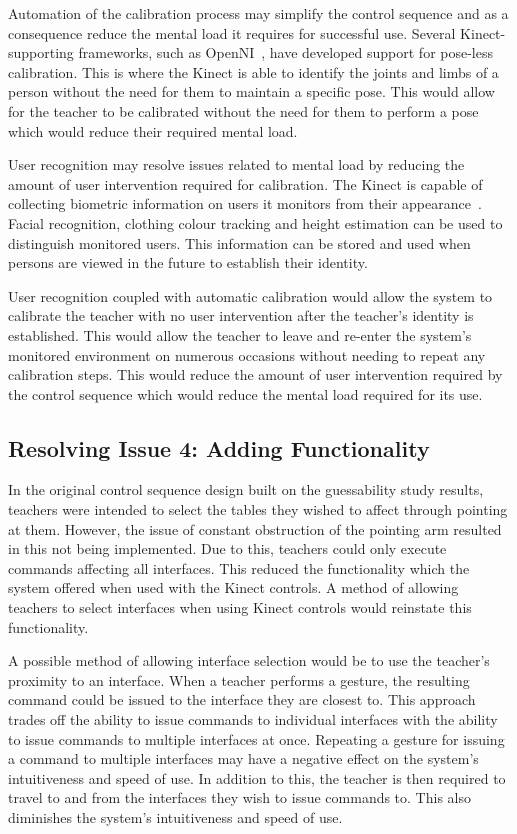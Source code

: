 \documentclass[manuscript, review, screen]{acmart}
\begin{document}
Automation of the calibration process may simplify the control sequence and as a consequence reduce the mental load it requires for successful use.
Several Kinect-supporting frameworks, such as OpenNI~\cite{Organisation2011}, have developed support for pose-less calibration.
This is where the Kinect is able to identify the joints and limbs of a person without the need for them to maintain a specific pose.
This would allow for the teacher to be calibrated without the need for them to perform a pose which would reduce their required mental load.

User recognition may resolve issues related to mental load by reducing the amount of user intervention required for calibration.
The Kinect is capable of collecting biometric information on users it monitors from their appearance~\cite{Leyvand2011}.
Facial recognition, clothing colour tracking and height estimation can be used to distinguish monitored users.
This information can be stored and used when persons are viewed in the future to establish their identity.

User recognition coupled with automatic calibration would allow the system to calibrate the teacher with no user intervention after the teacher's identity is established.
This would allow the teacher to leave and re-enter the system's monitored environment on numerous occasions without needing to repeat any calibration steps.
This would reduce the amount of user intervention required by the control sequence which would reduce the mental load required for its use.

\subsection{Resolving Issue 4: Adding Functionality}
\label{sec:improveFunctionality}


In the original control sequence design built on the guessability study results, teachers were intended to select the tables they wished to affect through pointing at them.
However, the issue of constant obstruction of the pointing arm resulted in this not being implemented.
Due to this, teachers could only execute commands affecting all interfaces.
This reduced the functionality which the system offered when used with the Kinect controls.
A method of allowing teachers to select interfaces when using Kinect controls would reinstate this functionality.

A possible method of allowing interface selection would be to use the teacher's proximity to an interface.
When a teacher performs a gesture, the resulting command could be issued to the interface they are closest to.
This approach trades off the ability to issue commands to individual interfaces with the ability to issue commands to multiple interfaces at once.
Repeating a gesture for issuing a command to multiple interfaces may have a negative effect on the system's intuitiveness and speed of use.
In addition to this, the teacher is then required to travel to and from the interfaces they wish to issue commands to.
This also diminishes the system's intuitiveness and speed of use.
\end{document}
